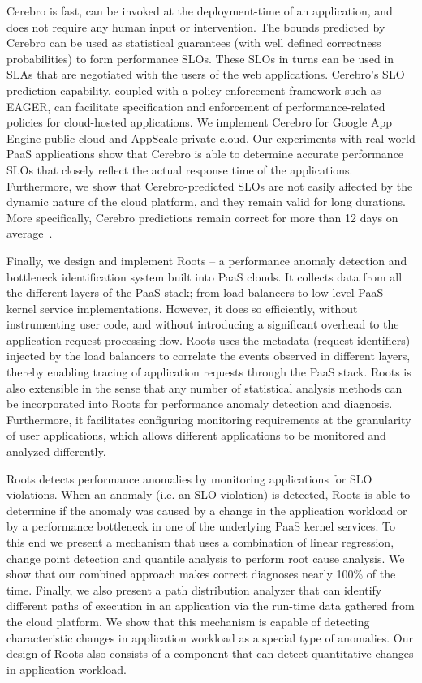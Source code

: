 Cerebro is fast, can be invoked at the deployment-time 
of an application, and does not require any human input or intervention. 
The bounds predicted by Cerebro can be used as statistical guarantees (with well defined correctness
probabilities) to form performance SLOs. These SLOs in turns can be used in SLAs that are negotiated
with the users of the web applications. Cerebro's SLO prediction capability, coupled with a policy
enforcement framework such as EAGER, can facilitate specification and enforcement of performance-related
policies for cloud-hosted applications. We implement Cerebro for Google App Engine public cloud
and AppScale private cloud. Our experiments with real world PaaS applications show that Cerebro
is able to determine accurate performance SLOs that closely reflect the actual response time
of the applications. Furthermore, we show that Cerebro-predicted SLOs are not easily affected by
the dynamic nature of the cloud platform, and they remain valid for long durations. More specifically, 
Cerebro predictions remain correct for more than 12 days on average~\cite{7396174}. 

Finally, we design and implement Roots -- a performance anomaly detection and 
bottleneck identification system built into PaaS clouds. It collects data from all the different layers of the
PaaS stack; from load balancers to low level PaaS kernel service implementations. However,
it does so efficiently, without instrumenting user code, and without introducing a significant
overhead to the application request processing flow. 
Roots uses the metadata (request identifiers) injected by the load balancers to correlate the
events observed in different layers, 
thereby enabling tracing of application requests through the PaaS stack.
Roots is also extensible in the sense that 
any number of statistical analysis methods can be incorporated into Roots for performance
anomaly detection and diagnosis. Furthermore, it facilitates configuring monitoring requirements
at the granularity of user applications, which allows different applications to be monitored
and analyzed differently. 

Roots detects performance anomalies by monitoring applications for SLO violations. 
When an anomaly (i.e. an SLO violation) is detected, Roots is able to determine if
the anomaly was caused by a change in the application workload or by a performance 
bottleneck in one of the underlying PaaS kernel services. To this end we present a mechanism
that uses a combination of linear regression, change point detection and quantile analysis to
perform root cause analysis. We show that our combined approach makes correct diagnoses nearly
100\% of the time. Finally, we also present a path distribution analyzer that can identify different
paths of execution in an application via the run-time data gathered from the cloud platform.
We show that this mechanism is capable of detecting characteristic changes in application
workload as a special type of anomalies. Our design of Roots also consists of a component
that can detect quantitative changes in application workload.

